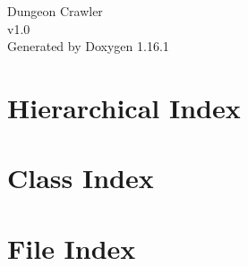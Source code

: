 \documentclass[twoside]{book}
\newcommand{\+}{\discretionary{\mbox{\scriptsize$\hookleftarrow$}}{}{}}
\newcommand{\clearemptydoublepage}{%
    \newpage{\pagestyle{empty}\cleardoublepage}%
  }
\begin{document}
  \raggedbottom
    \hypersetup{pageanchor=false,
                bookmarksnumbered=true,
                pdfencoding=unicode
               }
  \begin{titlepage}
  \vspace*{7cm}
  \begin{center}%
  {\Large Dungeon Crawler}\\
  [1ex]\large v1.\+0 \\
  \vspace*{1cm}
  {\large Generated by Doxygen 1.16.1}\\
  \end{center}
  \end{titlepage}
  \clearemptydoublepage
  \tableofcontents
  \clearemptydoublepage
  \hypersetup{pageanchor=true}
\chapter{Hierarchical Index}

\chapter{Class Index}

\chapter{File Index}

\end{document}
